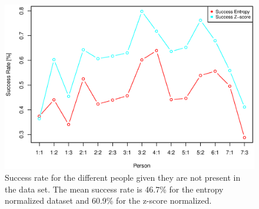\begin{figure}[H]
\centering
\includegraphics[width = 0.95 \textwidth]{graphics/successRate_randomForest_comp}
\caption[Success rate for Random Forest.]{Success rate for the different people given they are not present in the data set. The mean success rate is 46.7\% for the entropy normalized dataset and 60.9\% for the z-score normalized.}
\label{fig:success_randomForest}
\end{figure}